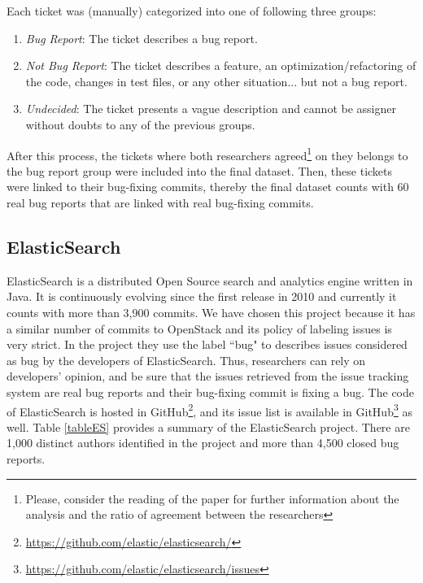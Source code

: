 \documentclass[a4paper, 12pt]{book}
\begin{document}
Each ticket was (manually) categorized into one of following three groups:
\begin{enumerate}
  \item \textit{Bug Report}: The ticket describes a bug report.
  \item \textit{Not Bug Report}: The ticket describes a feature, an optimization/refactoring of the code, changes in test files, or any other situation... but not a bug report.
  \item \textit{Undecided}: The ticket presents a vague description and cannot be assigner without doubts to any of the previous groups.
\end{enumerate}

After this process, the tickets where both researchers agreed\footnote{Please, consider the reading of the paper for further information about the analysis and the ratio of agreement between the researchers} on they belongs to the bug report group were included into the final dataset. Then, these tickets were linked to their bug-fixing commits, thereby the final dataset counts with 60 real bug reports that are linked with real bug-fixing commits.

\subsection{ElasticSearch}
ElasticSearch is a distributed Open Source search and analytics engine written in Java. It is continuously evolving since the first release in 2010 and currently it counts with more than 3,900 commits. We have chosen this project because it has a similar number of commits to OpenStack and its policy of labeling issues is very strict. In the project they use the label ``bug" to describes issues considered as bug by the developers of ElasticSearch. Thus, researchers can rely on developers' opinion, and be sure that the issues retrieved from the issue tracking system are real bug reports and their bug-fixing commit is fixing a bug. The code of ElasticSearch is hosted in GitHub\footnote{\url{https://github.com/elastic/elasticsearch/}}, and its issue list is available in GitHub\footnote{\url{https://github.com/elastic/elasticsearch/issues}} as well. Table \ref{tableES} provides a summary of the ElasticSearch project. There are 1,000 distinct authors identified in the project and more than 4,500 closed bug reports. 
\end{document}
